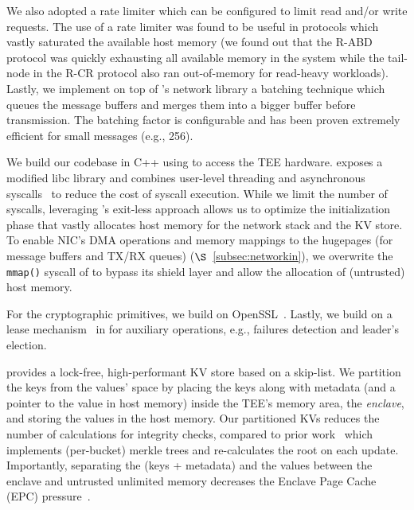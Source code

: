 We also adopted a rate limiter which can be configured to limit read and/or write requests. The use of a rate limiter was found to be useful in protocols which vastly saturated the available host memory (we found out that the R-ABD protocol was quickly exhausting all available memory in the system while the tail-node in the R-CR protocol also ran out-of-memory for read-heavy workloads). Lastly, we implement on top of \projecttitle{}'s network library a batching technique which queues the message buffers and merges them into a bigger buffer before transmission. The batching factor is configurable and has been proven extremely efficient for small messages (e.g., \SI{256}{\byte}).

\fi 


 We build our codebase in C++ using \scone{} to access the TEE hardware. \scone{} exposes a modified libc library and combines user-level threading and asynchronous syscalls~\cite{flexsc} to reduce the cost of syscall execution. While we limit the number of syscalls, leveraging  \scone{}'s exit-less approach allows us to optimize the initialization phase that vastly allocates host memory for the network stack and the KV store. To enable NIC's DMA operations and memory mappings to the hugepages (for message buffers and TX/RX queues) ($\S$~\ref{subsec:networkin}), we overwrite the \texttt{mmap()} syscall of \scone{} to bypass its shield layer and allow the allocation of (untrusted) host memory. 

For the cryptographic primitives, we build on OpenSSL~\cite{openssl}. Lastly, we build on a lease mechanism~\cite{t-lease} in \scone{} for auxiliary operations, e.g., failures detection and leader's election.




 \projecttitle{} provides a lock-free, high-performant KV store based on a skip-list. We partition the keys from the values' space by placing the keys along with metadata (and a pointer to the value in host memory) inside the TEE's memory area, the {\em enclave}, and storing the values in the host memory. Our partitioned KVs reduces the number of calculations for integrity checks, compared to prior work~\cite{shieldstore} which implements (per-bucket) merkle trees and re-calculates the root on each update. Importantly, separating the (keys + metadata) and the values between the enclave and untrusted unlimited memory decreases the Enclave Page Cache (EPC) pressure~\cite{speicher-fast}. %

